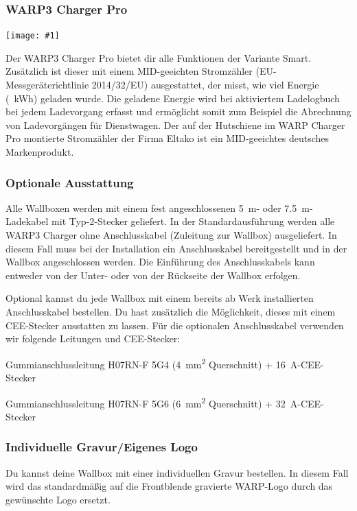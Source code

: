 \documentclass[a4paper,10pt]{article}
\newcommand{\gfx}[1]{\texttt{[image: \#1]}}
\begin{document}
\begin{multicols*}{2}
	\subsubsection*{WARP3 Charger Pro}
	\gfx{./img_warp3/resized/warp3_pro_open}

    Der WARP3 Charger Pro bietet dir alle Funktionen der Variante Smart.
    Zusätzlich ist dieser mit einem MID-geeichten Stromzähler (EU-Messgeräterichtlinie 2014/32/EU)
    ausgestattet, der misst, wie viel Energie (\SI{}{\kWh}) geladen
    wurde. Die geladene Energie wird bei aktiviertem Ladelogbuch bei jedem
	Ladevorgang erfasst und ermöglicht somit zum Beispiel die Abrechnung von Ladevorgängen für
	Dienstwagen. Der auf der Hutschiene im WARP Charger Pro montierte Stromzähler der Firma Eltako ist ein MID-geeichtes deutsches Markenprodukt.

	\subsubsection*{Optionale Ausstattung}
    Alle Wallboxen werden mit einem fest angeschlossenen
    \SI{5}{\meter}- oder \SI{7,5}{\meter}-Ladekabel mit Typ-2-Stecker geliefert.
    In der Standardausführung werden alle WARP3 Charger ohne Anschlusskabel
    (Zuleitung zur Wallbox) ausgeliefert. In diesem Fall muss bei der Installation
    ein Anschlusskabel bereitgestellt und in der Wallbox angeschlossen werden.
    Die Einführung des Anschlusskabels kann entweder von der Unter- oder von
    der Rückseite der Wallbox erfolgen.

    Optional kannst du jede Wallbox mit einem bereits ab Werk
    installierten Anschlusskabel bestellen. Du hast zusätzlich die
    Möglichkeit, dieses mit einem CEE-Stecker ausstatten zu lassen.
    Für die optionalen Anschluss\-kabel verwenden wir folgende Leitungen und CEE-Stecker:

    \begin{description}[leftmargin=!,labelwidth=\widthof{\textbf{\SI{22}{\kilo\watt}}}]
        \item[\SI{11}{\kilo\watt}]Gummianschlussleitung H07RN-F 5G4
              (\SI{4}{\square\milli\meter}
              Querschnitt) + \SI{16}{\ampere}-CEE-Stecker
        \item[\SI{22}{\kilo\watt}]Gummianschlussleitung H07RN-F 5G6
              (\SI{6}{\square\milli\meter}
              Querschnitt) + \SI{32}{\ampere}-CEE-Stecker
    \end{description}

	\subsubsection*{Individuelle Gravur/Eigenes Logo}
	Du kannst deine Wallbox mit einer individuellen Gravur bestellen.
	In diesem Fall wird das standardmäßig auf die Frontblende gravierte WARP-Logo
	durch das gewünschte Logo ersetzt.


\end{multicols*}
\end{document}
